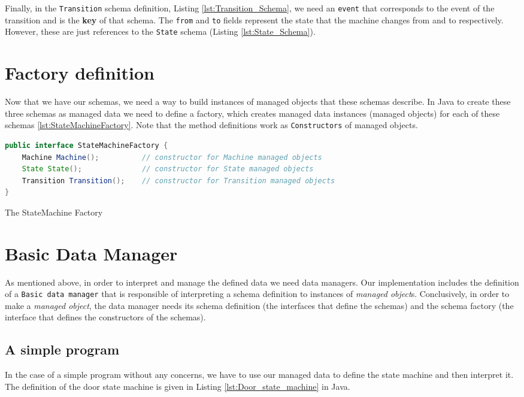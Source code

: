 Finally, in the \texttt{Transition} schema definition, Listing \ref{lst:Transition_Schema}, we need an \texttt{event} that corresponds to the event of the transition and is the \textbf{key} of that schema.
The \texttt{from} and \texttt{to} fields represent the state that the machine changes from and to respectively.
However, these are just references to the \texttt{State} schema (Listing \ref{lst:State_Schema}).

\section{Factory definition}
Now that we have our schemas, we need a way to build instances of managed objects that these schemas describe. 
In Java to create these three schemas as managed data we need to define a factory, which creates managed data instances (managed objects) for each of these schemas \ref{lst:StateMachineFactory}.
Note that the method definitions work as \texttt{Constructors} of managed objects.

\begin{sourcecode}[H]
	\begin{lstlisting}[language=Java,escapechar=|]
public interface StateMachineFactory {
	Machine Machine();  		// constructor for Machine managed objects
	State State(); 				// constructor for State managed objects
	Transition Transition(); 	// constructor for Transition managed objects
}
	\end{lstlisting}
	\caption{The StateMachine Factory}
	\label{lst:StateMachineFactory}
\end{sourcecode}

\section{Basic Data Manager}
As mentioned above, in order to interpret and manage the defined data we need data managers. 
Our implementation includes the definition of a \texttt{Basic data manager} that is responsible of interpreting a schema definition to instances of \textit{managed object}s.
Conclusively, in order to make a \textit{managed object}, the data manager needs its schema definition (the interfaces that define the schemas) and the schema factory (the interface that defines the constructors of the schemas).

\subsection{A simple program}
In the case of a simple program without any concerns, we have to use our managed data to define the state machine and then interpret it.
The definition of the door state machine is given in Listing \ref{lst:Door_state_machine} in Java.

